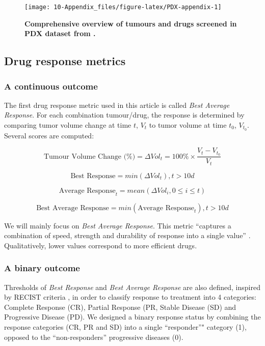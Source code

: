 \documentclass[a4paper,12pt,twoside,onecolumn,openright,final,oldfontcommands]{memoir}
\begin{document}
\begin{figure}

{\centering \texttt{[image: 10-Appendix\_files/figure-latex/PDX-appendix-1]} 

}

\caption[Comprehensive overview of tumours and drugs screened in PDX dataset from @gao2015high]{\textbf{Comprehensive overview of tumours and
drugs screened in PDX dataset from \citet{gao2015high}.}}\label{fig:PDX-appendix}
\end{figure}




\subsection{Drug response metrics}\label{drug-response-metrics}

\subsubsection{A continuous outcome}\label{a-continuous-outcome}

The first drug response metric used in this article is called \emph{Best
Average Response}. For each combination tumour/drug, the response is
determined by comparing tumor volume change at time \(t\), \(V_t\) to
tumor volume at time \(t_0\), \(V_{t_0}\). Several scores are computed:

\[\text{Tumour Volume Change (\%)} = \Delta Vol_t = 100\% \times \dfrac{V_t-V_{t_0}}{V_t}\]

\[\text{Best Response} = min(\Delta Vol_t), t>10d\]

\[\text{Average Response}_t = mean(\Delta Vol_i, 0 \leq i\leq t)\]

\[\text{Best Average Response} = min(\text{Average Response}_t), t>10d\]

We will mainly focus on \emph{Best Average Response}. This metric
``captures a combination of speed, strength and durability of response
into a single value'' \citep{gao2015high}. Qualitatively, lower values
correspond to more efficient drugs.

\subsubsection{A binary outcome}\label{a-binary-outcome}

Thresholds of \emph{Best Response} and \emph{Best Average Response} are
also defined, inspired by RECIST criteria \citep{therasse2000new}, in
order to classify response to treatment into 4 categories: Complete
Response (CR), Partial Response (PR, Stable Disease (SD) and Progressive
Disease (PD). We designed a binary response status by combining the
response categories (CR, PR and SD) into a single ``responder''"
category (1), opposed to the ``non-responders'' progressive diseases
(0).
\end{document}
